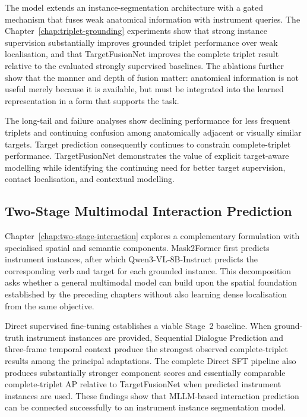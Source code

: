 The model extends an instance-segmentation architecture with a gated mechanism that fuses weak anatomical information with instrument queries. The Chapter~\ref{chap:triplet-grounding} experiments show that strong instance supervision substantially improves grounded triplet performance over weak localisation, and that TargetFusionNet improves the complete triplet result relative to the evaluated strongly supervised baselines. The ablations further show that the manner and depth of fusion matter: anatomical information is not useful merely because it is available, but must be integrated into the learned representation in a form that supports the task.

The long-tail and failure analyses show declining performance for less frequent triplets and continuing confusion among anatomically adjacent or visually similar targets. Target prediction consequently continues to constrain complete-triplet performance. TargetFusionNet demonstrates the value of explicit target-aware modelling while identifying the continuing need for better target supervision, contact localisation, and contextual modelling.

\subsection{Two-Stage Multimodal Interaction Prediction}
\label{sec:discussion-two-stage}

Chapter~\ref{chap:two-stage-interaction} explores a complementary formulation with specialised spatial and semantic components. Mask2Former first predicts instrument instances, after which Qwen3-VL-8B-Instruct predicts the corresponding verb and target for each grounded instance. This decomposition asks whether a general multimodal model can build upon the spatial foundation established by the preceding chapters without also learning dense localisation from the same objective.

Direct supervised fine-tuning establishes a viable Stage~2 baseline. When ground-truth instrument instances are provided, Sequential Dialogue Prediction and three-frame temporal context produce the strongest observed complete-triplet results among the principal adaptations. The complete Direct SFT pipeline also produces substantially stronger component scores and essentially comparable complete-triplet AP relative to TargetFusionNet when predicted instrument instances are used. These findings show that MLLM-based interaction prediction can be connected successfully to an instrument instance segmentation model.

